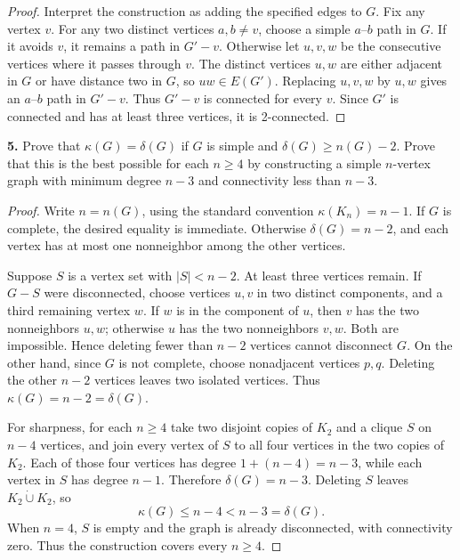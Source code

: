 \documentclass[12pt]{amsart}
\theoremstyle{conjecture}
\theoremstyle{definition}
\theoremstyle{question}
\theoremstyle{theorem}
\begin{document}
    \begin{proof}

    Interpret the construction as adding the specified edges to $G$.
    Fix any vertex $v$. For any two distinct vertices $a,b\ne v$,
    choose a simple $a$--$b$ path in $G$. If it avoids $v$, it remains
    a path in $G'-v$. Otherwise let $u,v,w$ be the consecutive vertices
    where it passes through $v$. The distinct vertices $u,w$ are either
    adjacent in $G$ or have distance two in $G$, so $uw\in E(G')$.
    Replacing $u,v,w$ by $u,w$ gives an $a$--$b$ path in $G'-v$.
    Thus $G'-v$ is connected for every $v$. Since $G'$ is connected
    and has at least three vertices, it is 2-connected.
    \end{proof}

    \noindent\textbf{5.} Prove that $\kappa(G) = \delta(G)$ if $G$ is simple and $\delta(G) \ge n(G) - 2$.
    Prove that this is the best possible for each $n\ge 4$ by constructing a simple $n$-vertex graph with
    minimum degree $n-3$ and connectivity less than $n-3$.

    \begin{proof}

    Write $n=n(G)$, using the standard convention
    $\kappa(K_n)=n-1$. If $G$ is complete, the desired equality is
    immediate. Otherwise $\delta(G)=n-2$, and each vertex has at most
    one nonneighbor among the other vertices.

    Suppose $S$ is a vertex set with $|S|<n-2$. At least three vertices
    remain. If $G-S$ were disconnected, choose vertices $u,v$ in two
    distinct components, and a third remaining vertex $w$. If $w$ is
    in the component of $u$, then $v$ has the two nonneighbors $u,w$;
    otherwise $u$ has the two nonneighbors $v,w$. Both are impossible.
    Hence deleting fewer than $n-2$ vertices cannot disconnect $G$.
    On the other hand, since $G$ is not complete, choose nonadjacent
    vertices $p,q$. Deleting the other $n-2$ vertices leaves two isolated
    vertices. Thus $\kappa(G)=n-2=\delta(G)$.

    For sharpness, for each $n\ge4$ take two disjoint copies of $K_2$
    and a clique $S$ on $n-4$ vertices, and join every vertex of $S$
    to all four vertices in the two copies of $K_2$. Each of those four
    vertices has degree $1+(n-4)=n-3$, while each vertex in $S$ has
    degree $n-1$. Therefore $\delta(G)=n-3$. Deleting $S$ leaves
    $K_2\mathbin{\dot\cup}K_2$, so
    \[
       \kappa(G)\le n-4<n-3=\delta(G).
    \]
    When $n=4$, $S$ is empty and the graph is already disconnected,
    with connectivity zero. Thus the construction covers every $n\ge4$.
    \end{proof}
\end{document}
